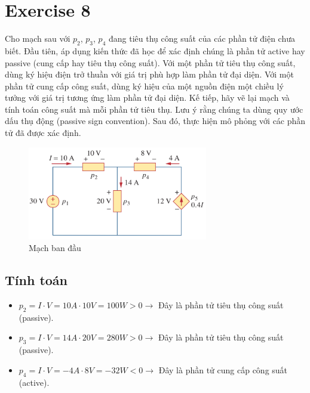 \section{Exercise 8}
Cho mạch sau với \(p_2\), \(p_3\), \(p_4\) đang tiêu thụ công suất của các phần tử điện chưa biết. Đầu tiên, áp dụng kiến thức đã học để xác định chúng là phần tử active hay passive (cung cấp hay tiêu thụ công suất). Với một phần tử tiêu thụ công suất, dùng ký hiệu điện trở thuần với giá trị phù hợp làm phần tử đại diện. Với một phần tử cung cấp công suất, dùng ký hiệu của một nguồn điện một chiều lý tưởng với giá trị tương ứng làm phần tử đại diện. Kế tiếp, hãy vẽ lại mạch và tính toán công suất mà mỗi phần tử tiêu thụ. Lưu ý rằng chúng ta dùng quy ước dấu thụ động (passive sign convention). Sau đó, thực hiện mô phỏng với các phần tử đã được xác định.  

\begin{figure}[!htbp]
    \centering
    \includegraphics[width=0.7\textwidth]{graphics/ex8/f1.png}
    \caption{Mạch ban đầu}
\end{figure}


\subsection{Tính toán}

\begin{itemize}
    \item \(p_2 = I \cdot V = 10A \cdot 10V = 100W > 0\longrightarrow \) Đây là phần tử tiêu thụ công suất (passive).
    \item \(p_3 = I \cdot V = 14A \cdot 20V = 280W > 0\longrightarrow \) Đây là phần tử tiêu thụ công suất (passive).
    \item \(p_4 = I \cdot V = -4A \cdot 8V = -32W  < 0\longrightarrow \)  Đây là phần tử cung cấp công suất (active).
\end{itemize}

